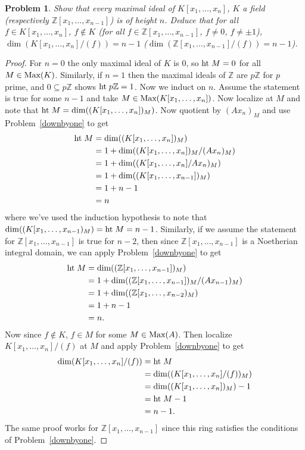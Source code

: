 \documentclass{article}
\newcommand{\Ht}{\textup{ht}\;}
\newcommand{\Max}{\textup{Max}}
\newtheorem{problem}{Problem}
\begin{document}
\begin{problem}
\label{fielddim}
Show that every maximal ideal of $K[x_1, \dots , x_n]$, $K$ a field (respectively $\mathbb{Z}[x_1, \dots , x_{n-1}]$) is of height $n$. Deduce that for all $f \in K[x_1, \dots , x_n]$, $f \notin K$ (for all $f \in \mathbb{Z}[x_1, \dots , x_{n-1}]$, $f \neq 0$, $f \neq \pm 1$), $\dim(K[x_1, \dots , x_n]/(f)) = n-1$ ($\dim(\mathbb{Z}[x_1, \dots , x_{n-1}]/(f)) = n-1$).
\end{problem}
\begin{proof}
For $n = 0$ the only maximal ideal of $K$ is $0$, so $\Ht M = 0$ for all $M \in \Max(K)$. Similarly, if $n = 1$ then the maximal ideals of $\mathbb{Z}$ are $p\mathbb{Z}$ for $p$ prime, and $0 \subseteq p\mathbb{Z}$ shows $\Ht p\mathbb{Z} = 1$. Now we induct on $n$. Assume the statement is true for some $n-1$ and take $M \in \Max(K[x_1, \dots , x_n])$. Now localize at $M$ and note that $\Ht M = \dim((K[x_1, \dots , x_n])_M)$. Now quotient by $(Ax_n)_M$ and use Problem~\ref{downbyone} to get
\begin{align*}
\Ht M
&= \dim((K[x_1, \dots , x_n])_M)\\
&= 1 + \dim((K[x_1, \dots , x_n])_M/(Ax_n)_M)\\
&= 1 + \dim((K[x_1, \dots , x_n]/Ax_n)_M)\\
&= 1 + \dim((K[x_1, \dots , x_{n-1}])_M)\\
&= 1 + n - 1\\
&= n
\end{align*}
where we've used the induction hypothesis to note that $\dim((K[x_1, \dots , x_{n-1})_M) = \Ht M = n-1$. Similarly, if we assume the statement for $\mathbb{Z}[x_1, \dots , x_{n-1}]$ is true for $n - 2$, then since $\mathbb{Z}[x_1, \dots , x_{n-1}]$ is a Noetherian integral domain, we can apply Problem~\ref{downbyone} to get
\begin{align*}
\Ht M
&= \dim((\mathbb{Z}[x_1, \dots , x_{n-1}])_M)\\
&= 1 + \dim((\mathbb{Z}[x_1, \dots , x_{n-1}])_M/(Ax_{n-1})_M)\\
&= 1 + \dim((\mathbb{Z}[x_1, \dots , x_{n-2})_M)\\
&= 1 + n - 1\\
&= n.
\end{align*}
Now since $f \notin K$, $f \in M$ for some $M \in \Max(A)$. Then localize $K[x_1, \dots , x_n]/(f)$ at $M$ and apply Problem~\ref{downbyone} to get
\begin{align*}
\dim(K[x_1, \dots , x_n]/(f))
&= \Ht M\\
&= \dim((K[x_1, \dots , x_n]/(f))_M)\\
&= \dim((K[x_1, \dots , x_n])_M) - 1\\
&= \Ht M - 1\\
&= n - 1.
\end{align*}
The same proof works for $\mathbb{Z}[x_1, \dots , x_{n-1}]$ since this ring satisfies the conditions of Problem~\ref{downbyone}.
\end{proof}
\end{document}
